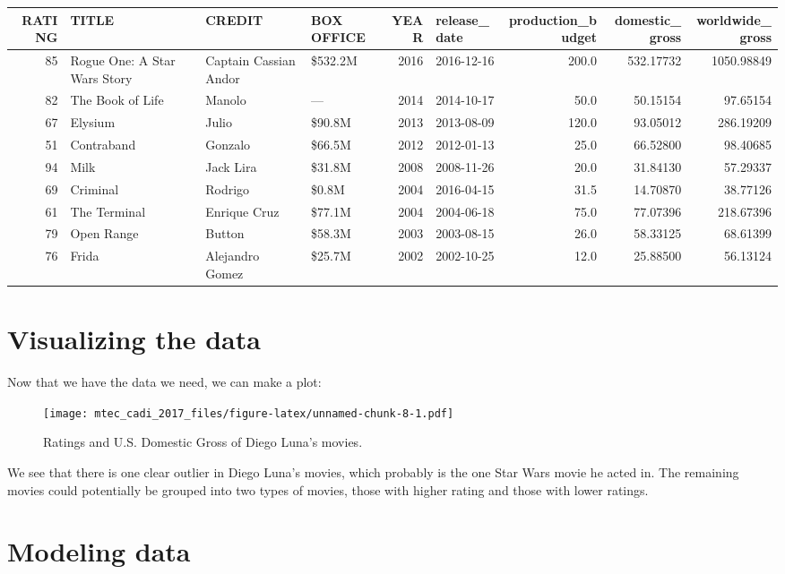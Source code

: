 \documentclass[12pt,]{book}
\theoremstyle{definition}
\theoremstyle{definition}
\theoremstyle{remark}
\begin{document}
\begin{tabular}{r|l|l|l|r|l|r|r|r}
\hline
RATING & TITLE & CREDIT & BOX OFFICE & YEAR & release\_date & production\_budget & domestic\_gross & worldwide\_gross\\
\hline
85 & Rogue One: A Star Wars Story & Captain Cassian Andor & \$532.2M & 2016 & 2016-12-16 & 200.0 & 532.17732 & 1050.98849\\
\hline
82 & The Book of Life & Manolo & — & 2014 & 2014-10-17 & 50.0 & 50.15154 & 97.65154\\
\hline
67 & Elysium & Julio & \$90.8M & 2013 & 2013-08-09 & 120.0 & 93.05012 & 286.19209\\
\hline
51 & Contraband & Gonzalo & \$66.5M & 2012 & 2012-01-13 & 25.0 & 66.52800 & 98.40685\\
\hline
94 & Milk & Jack Lira & \$31.8M & 2008 & 2008-11-26 & 20.0 & 31.84130 & 57.29337\\
\hline
69 & Criminal & Rodrigo & \$0.8M & 2004 & 2016-04-15 & 31.5 & 14.70870 & 38.77126\\
\hline
61 & The Terminal & Enrique Cruz & \$77.1M & 2004 & 2004-06-18 & 75.0 & 77.07396 & 218.67396\\
\hline
79 & Open Range & Button & \$58.3M & 2003 & 2003-08-15 & 26.0 & 58.33125 & 68.61399\\
\hline
76 & Frida & Alejandro Gomez & \$25.7M & 2002 & 2002-10-25 & 12.0 & 25.88500 & 56.13124\\
\hline
\end{tabular}

\section{Visualizing the data}\label{visualizing-the-data}

Now that we have the data we need, we can make a plot:

\begin{figure}
\centering
\texttt{[image: mtec\_cadi\_2017\_files/figure-latex/unnamed-chunk-8-1.pdf]}
\caption{\label{fig:unnamed-chunk-8}Ratings and U.S. Domestic Gross of Diego
Luna's movies.}
\end{figure}

We see that there is one clear outlier in Diego Luna's movies, which
probably is the one Star Wars movie he acted in. The remaining movies
could potentially be grouped into two types of movies, those with higher
rating and those with lower ratings.

\section{Modeling data}\label{modeling-data}
\end{document}
